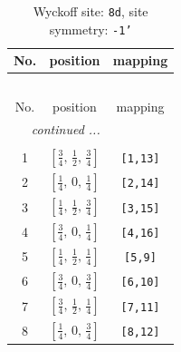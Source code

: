 \documentclass[fleqn,8pt]{jsarticle}
\begin{document}
\begin{longtable}{ccc}
\caption{Wyckoff site: {\tt 8d}, site symmetry: {\tt -1'}}
 \\
 \hline \hline
No. & position & mapping \\ \hline \endfirsthead

\multicolumn{2}{l}{\tablename\ \thetable{}} \\
 \hline \hline
No. & position & mapping \\ \hline \endhead

 \hline \hline
\multicolumn{2}{r}{\footnotesize\it continued ...} \\ \endfoot

 \hline \hline
\multicolumn{2}{r}{} \\ \endlastfoot

1 & $\left[ \frac{3}{4},\, \frac{1}{2},\, \frac{3}{4} \right]$ & {\tt [1,13]} \\ \hline
2 & $\left[ \frac{1}{4},\, 0,\, \frac{1}{4} \right]$ & {\tt [2,14]} \\ \hline
3 & $\left[ \frac{1}{4},\, \frac{1}{2},\, \frac{3}{4} \right]$ & {\tt [3,15]} \\ \hline
4 & $\left[ \frac{3}{4},\, 0,\, \frac{1}{4} \right]$ & {\tt [4,16]} \\ \hline
5 & $\left[ \frac{1}{4},\, \frac{1}{2},\, \frac{1}{4} \right]$ & {\tt [5,9]} \\ \hline
6 & $\left[ \frac{3}{4},\, 0,\, \frac{3}{4} \right]$ & {\tt [6,10]} \\ \hline
7 & $\left[ \frac{3}{4},\, \frac{1}{2},\, \frac{1}{4} \right]$ & {\tt [7,11]} \\ \hline
8 & $\left[ \frac{1}{4},\, 0,\, \frac{3}{4} \right]$ & {\tt [8,12]} \\
\end{longtable}
\renewcommand{\arraystretch}{1.2}
\end{document}
